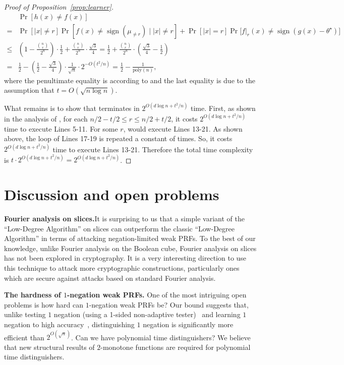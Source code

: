 \documentclass{toc}
\newcommand{\warn}[1]{#1}
\begin{document}
\begin{proof}[Proof of Proposition~\ref{prop:learner}]
\begin{align}
& \Pr[h(x)\neq f(x)] \\
= &\Pr[|x|\neq r]\Pr[f(x)\neq \operatorname{sign}(\mu_{\neq r})\mid |x|\neq r]+\Pr[|x|=r]\Pr\big[f|_{r}(x)\neq \operatorname{sign}(g(x)-\theta^\star)\big]\\
\leq &\left(1-
%
\frac{\binom{n}{r}}{2^n} %
\right)\cdot \frac{1}{2}+ 
%
\frac{\binom{n}{r}}{2^n}  %
\cdot \frac{\sqrt{3}}{4} =\frac{1}{2} + 
%
\frac{\binom{n}{r}}{2^n} %
\cdot\left(\frac{\sqrt{3}}{4}-\frac{1}{2}\right)\\=&\frac{1}{2}-\left(\frac{1}{2}-\frac{\sqrt{3}}{4}\right)\cdot\frac{1}{\sqrt{n}}\cdot 2^{-O(t^2/n)}=\frac{1}{2} - \frac{1}{\mbox{poly}(n)},
%
\end{align} %
\warn{where the
%
penultimate  %
equality is according to \expref{Proposition}{prop:binomial} and the last equality is due to %
the assumption that  %
$t=O(\sqrt{n\log n})$.}

What remains is to show that  terminates in $2^{O(d\log n + t^2/n)}$ time. First, as shown in the analysis of , for each $n/2-t/2\leq r\leq n/2+t/2$, it costs $2^{O(d\log n + t^2/n)}$ time to execute Lines 5-11. For some $r$,  would execute Lines 13-21. As shown above, the loop of Lines 17-19 is  repeated a constant of times. So, it costs $2^{O(d\log n + t^2/n)}$ time to execute Lines 13-21. Therefore the total time complexity is $t\cdot 2^{O(d\log n + t^2/n)}=2^{O(d\log n + t^2/n)}$.
\end{proof}

\section{Discussion and open problems}\label{sec:discussion}

\noindent\textbf{Fourier analysis on slices.}\quad It is surprising to us that a simple variant of the ``Low-Degree Algorithm'' on slices can outperform the classic ``Low-Degree Algorithm'' in terms of attacking negation-limited weak PRFs. To the best of our knowledge, unlike Fourier analysis on the Boolean cube, Fourier analysis on slices has not been explored in cryptography. It is
%
a very  %
interesting direction to use this technique to attack more cryptographic constructions, particularly ones which are secure against attacks based on standard Fourier analysis. 

\vspace{2ex}
%
\noindent\textbf{The hardness of $1$-negation weak PRFs.} One of the most intriguing open problems is how hard can $1$-negation weak PRFs be? Our bound suggests that, unlike testing $1$ negation (using a 1-sided non-adaptive tester)~\cite{GKW19} and learning $1$ negation to high accuracy~\cite{BCOST15}, distinguishing $1$ negation is significantly more efficient than $2^{O(\sqrt{n})}$. Can we have polynomial time distinguishers? We believe that new structural results of $2$-monotone functions are required for polynomial time distinguishers.  
\end{document}
